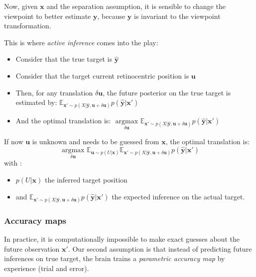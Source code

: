 Now, given $\boldsymbol{x}$ and the separation assumption, it is sensible to change the viewpoint to better estimate $\boldsymbol{y}$, because  $\boldsymbol{y}$ is invariant to the viewpoint transformation.

This is where \emph{active inference} comes into the play:
\begin{itemize}
\item Consider that the true target is $\hat{\boldsymbol{y}}$
\item Consider that the target current retinocentric position is $\boldsymbol{u}$
\item Then, for any translation $\delta \boldsymbol{u}$, the future posterior on the true target is estimated by:
$\mathbb{E}_{\boldsymbol{x}'\sim p(X|\hat{\boldsymbol{y}}, \boldsymbol{u}+\delta \boldsymbol{u})} p(\hat{\boldsymbol{y}}|\boldsymbol{x}')$
\item And the optimal translation is:  $\underset{\delta\boldsymbol{u}}{\text{ argmax }}  \mathbb{E}_{\boldsymbol{x}'\sim p(X|\hat{\boldsymbol{y}}, \boldsymbol{u}+\delta \boldsymbol{u})} p(\hat{\boldsymbol{y}}|\boldsymbol{x}')$
\end{itemize}

If now $\boldsymbol{u}$ is unknown and needs to be guessed from $\boldsymbol{x}$, the optimal translation is:
$$\underset{\delta\boldsymbol{u}}{\text{ argmax }} \mathbb{E}_{\boldsymbol{u}\sim p(U|\boldsymbol{x})} \mathbb{E}_{\boldsymbol{x}'\sim p(X|\hat{\boldsymbol{y}}, \boldsymbol{u}+\delta \boldsymbol{u})} p(\hat{\boldsymbol{y}}|\boldsymbol{x}')$$
with :
\begin{itemize}
\item $p(U|\boldsymbol{x})$ the inferred target position
\item and $\mathbb{E}_{\boldsymbol{x}'\sim p(X|\hat{\boldsymbol{y}}, \boldsymbol{u}+\delta \boldsymbol{u})} p(\hat{\boldsymbol{y}}|\boldsymbol{x}')$ the expected inference on the actual target.
\end{itemize}

\subsubsection{Accuracy maps}
 
In practice, it is computationally impossible to make exact guesses about the future observation $\boldsymbol{x}'$. Our second assumption is that instead of predicting future inferences on true target, the brain trains a \emph{parametric accuracy map} by experience (trial and error).


